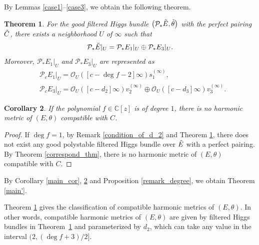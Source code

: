 \documentclass[pdftex]{sigma}
\numberwithin{equation}{section}
\newtheorem{Theorem}{Theorem}[section]
\newtheorem{Corollary}[Theorem]{Corollary}
\newcommand{\C}{\mathbb{C}}
\newcommand{\strsheaf}{\mathcal{O}}
\begin{document}
By Lemmas \ref{case1}--\ref{case3}, we obtain the following theorem.

\begin{Theorem}\label{classifying}
 For the good filtered Higgs bundle $\big(\mathcal{P}_*\Tilde{E},\Tilde{\theta}\big)$ with the perfect pairing $\Tilde{C}$, there exists a neighborhood $U$ of $\infty$ such that
 \begin{equation*}
 \mathcal{P}_*\Tilde{E}|_{U} = \mathcal{P}_*E_1|_{U} \oplus \mathcal{P}_*E_3|_{U}.
 \end{equation*}
 Moreover, $\mathcal{P}_*E_1|_{U}$ and $\mathcal{P}_*E_3|_{U}$ are represented as
 \begin{align*}
 & \mathcal{P}_{c}E_{1}|_{U} = \strsheaf_{U}([c -\deg{f}-2]\infty) s_1^{(\infty)}, \\
 & \mathcal{P}_{c}E_3|_{U} = \mathcal{O}_U([c-d_2]\infty)v^{(\infty)}_2 \oplus \mathcal{O}_U([c-d_3]\infty)v^{(\infty)}_3.
 \end{align*}
\end{Theorem}

\begin{Corollary}\label{sub_cor}
 If the polynomial $f\in \C[z]$ is of degree $1$, there is no harmonic metric of $(E,\theta)$ compatible with $C$.
\end{Corollary}
\begin{proof}
 If $\deg{f}=1$, by Remark \ref{condition_of_d_2} and Theorem \ref{classifying}, there does not exist any good polystable filtered Higgs bundle over $\Tilde{E}$ with a perfect pairing. By Theorem \ref{correspond_thm}, there is no harmonic metric of $(E,\theta)$ compatible with $C$.
\end{proof}

By Corollary \ref{main_cor}, \ref{sub_cor} and Proposition \ref{remark_degree}, we obtain Theorem \ref{main'}.
\begin{Remark}\label{rem_classifying}
 Theorem \ref{classifying} gives the classification of compatible harmonic metrics of $(E,\theta)$. In other words, compatible harmonic metrics of $(E,\theta)$ are given by filtered Higgs bundles in Theorem~\ref{classifying} and parameterized by $d_2$, which can take any value in the interval $(2,(\deg{f}+3)/2]$.
\end{Remark}
\end{document}
